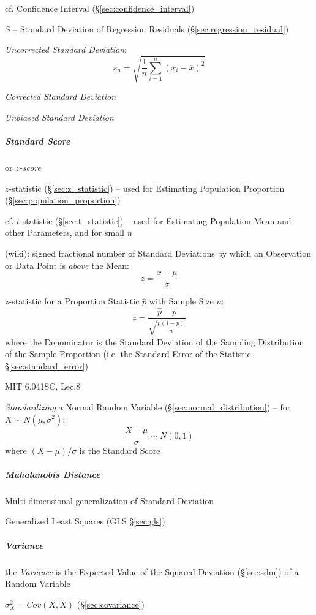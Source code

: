 cf. Confidence Interval (\S\ref{sec:confidence_interval})

$S$ -- Standard Deviation of Regression Residuals
(\S\ref{sec:regression_residual})

\emph{Uncorrected Standard Deviation}:
\[
  s_n = \sqrt{\frac{1}{n}\sum_{i=1}^n (x_i - \overline{x})^2}
\]

\emph{Corrected Standard Deviation}

\emph{Unbiased Standard Deviation}



\subparagraph{Standard Score}\label{sec:standard_score}\hfill

or \emph{$z$-score}

$z$-statistic (\S\ref{sec:z_statistic}) -- used for Estimating Population
Proportion (\S\ref{sec:population_proportion})

cf. $t$-statistic (\S\ref{sec:t_statistic}) -- used for Estimating Population
Mean and other Parameters, and for small $n$

(wiki): signed fractional number of Standard Deviations by which an Observation
or Data Point is \emph{above} the Mean:
\[
  z = \frac{x - \mu}{\sigma}
\]

$z$-statistic for a Proportion Statistic $\hat{p}$ with Sample Size $n$:
\[
  z = \frac{\hat{p} - p}{\sqrt{\frac{p(1-p)}{n}}}
\]
where the Denominator is the Standard Deviation of the Sampling Distribution of
the Sample Proportion (i.e. the Standard Error of the Statistic
\S\ref{sec:standard_error})

MIT 6.041SC, Lec.8

\emph{Standardizing} a Normal Random Variable (\S\ref{sec:normal_distribution})
-- for $X \sim N(\mu, \sigma^2)$:
\[
  \frac{X - \mu}{\sigma} \sim N(0, 1)
\]
where $(X - \mu)/\sigma$ is the Standard Score



\subparagraph{Mahalanobis Distance}\label{sec:mahalanobis_distance}\hfill

Multi-dimensional generalization of Standard Deviation

Generalized Least Squares (GLS \S\ref{sec:gls})



\subparagraph{Variance}\label{sec:variance}\hfill

the \emph{Variance} is the Expected Value of the Squared Deviation
(\S\ref{sec:sdm}) of a Random Variable

$\sigma_X^2 = Cov(X,X)$ (\S\ref{sec:covariance})

